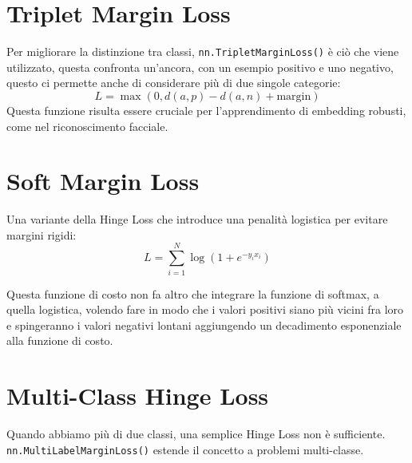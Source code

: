 \section{Triplet Margin Loss}
Per migliorare la distinzione tra classi, \texttt{nn.TripletMarginLoss()} è ciò che viene utilizzato, questa confronta un'ancora, con un esempio positivo e uno negativo, questo ci permette anche di considerare più di due singole categorie:
\begin{equation}
L = \max(0, d(a, p) - d(a, n) + \text{margin})
\end{equation}
Questa funzione risulta essere cruciale per l'apprendimento di embedding robusti, come nel riconoscimento facciale.

\section{Soft Margin Loss}
Una variante della Hinge Loss che introduce una penalità logistica per evitare margini rigidi:
\begin{equation}
L = \sum_{i=1}^{N} \log(1 + e^{-y_i x_i})
\end{equation}

Questa funzione di costo non fa altro che integrare la funzione di softmax, a quella logistica, volendo fare in modo che i valori positivi siano più vicini fra loro e spingeranno i valori negativi lontani aggiungendo un decadimento esponenziale alla funzione di costo.

\section{Multi-Class Hinge Loss}
Quando abbiamo più di due classi, una semplice Hinge Loss non è sufficiente. \texttt{nn.MultiLabelMarginLoss()} estende il concetto a problemi multi-classe. 

